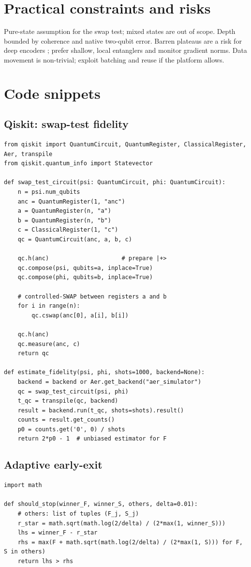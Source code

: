 \documentclass[11pt]{article}
\begin{document}
\section{Practical constraints and risks}
Pure-state assumption for the swap test; mixed states are out of scope. Depth bounded by coherence and native two-qubit error. Barren plateaus are a risk for deep encoders \citep{McClean2018}; prefer shallow, local entanglers and monitor gradient norms. Data movement is non-trivial; exploit batching and reuse if the platform allows.

\section{Code snippets}
\subsection*{Qiskit: swap-test fidelity}
\begin{lstlisting}[style=code,caption={Swap-test fidelity in Qiskit},label={lst:swaptest}]
from qiskit import QuantumCircuit, QuantumRegister, ClassicalRegister, Aer, transpile
from qiskit.quantum_info import Statevector

def swap_test_circuit(psi: QuantumCircuit, phi: QuantumCircuit):
    n = psi.num_qubits
    anc = QuantumRegister(1, "anc")
    a = QuantumRegister(n, "a")
    b = QuantumRegister(n, "b")
    c = ClassicalRegister(1, "c")
    qc = QuantumCircuit(anc, a, b, c)

    qc.h(anc)                     # prepare |+>
    qc.compose(psi, qubits=a, inplace=True)
    qc.compose(phi, qubits=b, inplace=True)

    # controlled-SWAP between registers a and b
    for i in range(n):
        qc.cswap(anc[0], a[i], b[i])

    qc.h(anc)
    qc.measure(anc, c)
    return qc

def estimate_fidelity(psi, phi, shots=1000, backend=None):
    backend = backend or Aer.get_backend("aer_simulator")
    qc = swap_test_circuit(psi, phi)
    t_qc = transpile(qc, backend)
    result = backend.run(t_qc, shots=shots).result()
    counts = result.get_counts()
    p0 = counts.get('0', 0) / shots
    return 2*p0 - 1  # unbiased estimator for F
\end{lstlisting}

\subsection*{Adaptive early-exit}
\begin{lstlisting}[style=code,caption={Hoeffding-interval early-exit},label={lst:earlyexit}]
import math

def should_stop(winner_F, winner_S, others, delta=0.01):
    # others: list of tuples (F_j, S_j)
    r_star = math.sqrt(math.log(2/delta) / (2*max(1, winner_S)))
    lhs = winner_F - r_star
    rhs = max(F + math.sqrt(math.log(2/delta) / (2*max(1, S))) for F, S in others)
    return lhs > rhs
\end{lstlisting}
\end{document}
